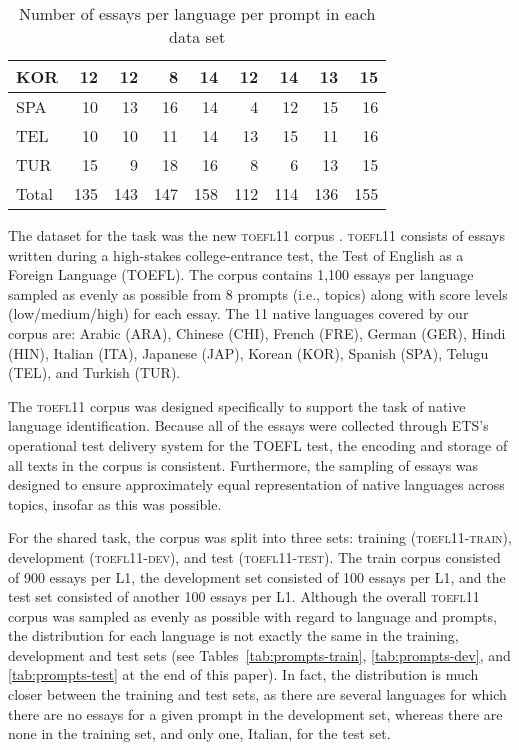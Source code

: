 \documentclass[11pt,letterpaper]{article}
\begin{document}
\begin{table*}[!ht]
\begin{small}
\begin{center}
{\begin{tabular}{lrrrrrrrr}
            KOR     &   12 & 12 & 8  & 14 & 12 & 14 & 13 & 15 \\ \hline
            SPA    &   10 & 13 & 16 & 14 & 4  & 12 & 15 & 16 \\ \hline
            TEL     &   10 & 10 & 11 & 14 & 13 & 15 & 11 & 16 \\ \hline
            TUR    &   15 & 9  & 18 & 16 & 8  & 6  & 13 & 15 \\ \hline \hline
            Total      &   135&143 & 147& 158& 112& 114& 136& 155 \\ \hline
        \end{tabular}
}
\end{center}
\end{small}
\caption{Number of essays per language per prompt in each data set}
\end{table*}

The dataset for the task was the new \textsc{toefl11} corpus
\cite{blanchard-tetreault-higgins-cahill-chodorow:2013:TOEFL11-RR}. \textsc{toefl11}
consists of essays written during a high-stakes college-entrance test, the Test
of English as a Foreign Language (TOEFL\textsuperscript{\textregistered}). The
corpus contains 1,100 essays per language sampled as evenly as possible from 8
prompts (i.e., topics) along with score levels (low/medium/high) for each essay.
The 11 native languages covered by our corpus are: Arabic (ARA), Chinese
(CHI), French (FRE), German (GER), Hindi (HIN), Italian (ITA), Japanese
(JAP), Korean (KOR), Spanish (SPA), Telugu (TEL), and Turkish (TUR).

The \textsc{toefl11} corpus was designed specifically to support the task of native
language identification.  Because all of the essays were collected through ETS's
operational test delivery system for the TOEFL\textsuperscript{\textregistered}
test, the encoding and storage of all texts in the corpus is consistent.
Furthermore, the sampling of essays was designed to ensure approximately equal
representation of native languages across topics, insofar as this was possible.

For the shared task, the corpus was split into three sets: training (\textsc{toefl11-train}),
development (\textsc{toefl11-dev}), and test (\textsc{toefl11-test}). The train corpus consisted
of 900 essays per L1, the development set consisted of 100 essays per L1,
and the test set consisted of another 100 essays per L1.
Although the overall \textsc{toefl11} corpus was sampled as evenly
as possible with regard to language and prompts, the distribution for each
language is not exactly the same in the training, development and test sets (see
Tables~\ref{tab:prompts-train}, \ref{tab:prompts-dev}, and
\ref{tab:prompts-test} at the end of this paper). In fact, the distribution is much closer between the
training and test sets, as there are several languages for which there are no
essays for a given prompt in the development set, whereas there are none in the
training set, and only one, Italian, for the test set.
\end{document}
